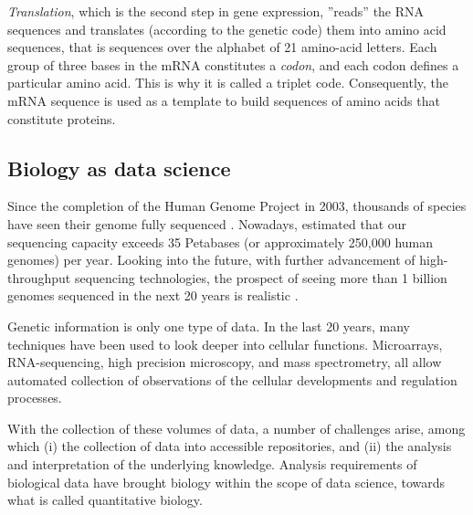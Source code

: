 \emph{Translation}, which is the second step in gene expression, ''reads'' the RNA sequences and translates (according to the genetic code) them into amino acid sequences, that is sequences over the alphabet of 21 amino-acid letters.  Each group of three bases in the mRNA constitutes a  \emph{codon}, and each codon defines a particular amino acid. This is why it is called a triplet code. Consequently, the mRNA sequence is used as a template to build sequences of amino acids that constitute proteins.



\subsection{Biology as data science}


Since the completion of the Human Genome Project in 2003, thousands of species have seen their genome fully sequenced \parencite{reddy2014genomes}.
Nowadays, \textcite{regalado2014emtech} estimated that our sequencing capacity exceeds 35 Petabases (or approximately 250,000 human genomes) per year.
Looking into the future, with further advancement of high-throughput sequencing technologies, the prospect of seeing more than 1 billion genomes sequenced in the next 20 years is  realistic \parencite{schatz2015biological}.

Genetic information is only one type of data.
In the last 20 years, many techniques have been used to look deeper into  cellular functions.
Microarrays, RNA-sequencing, high precision microscopy, and mass spectrometry, all allow automated collection of observations of the cellular developments and regulation processes.

With the collection of these volumes of data, a number of challenges arise, among which (i) the collection of data  into accessible repositories, and (ii) the analysis and interpretation of the underlying knowledge.
Analysis requirements of biological data have brought  biology within the scope of data science, towards what is called quantitative biology.



